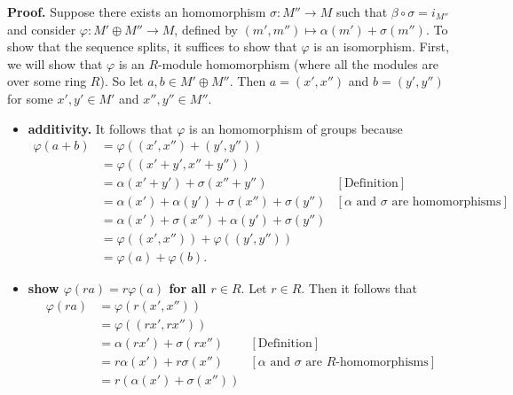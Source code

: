 \documentclass[9pt]{article}
\begin{document}
\begin{enumerate}
      \textbf{Proof.} Suppose there exists an homomorphism
      $\sigma : M''\rightarrow M$ such that $\beta \circ \sigma = i_{M''}$ and
      consider $\varphi : M' \oplus M'' \rightarrow M$, defined by
      $(m', m'') \mapsto \alpha(m') + \sigma(m'')$. To show that the sequence
      splits, it suffices to show that $\varphi$ is an isomorphism. First, we
      will show that $\varphi$ is an $R$-module homomorphism (where all the
      modules are over some ring $R$). So let $a, b \in M' \oplus M''$. Then
      $a = (x', x'')$ and $b = (y', y'')$ for some $x', y' \in M'$ and
      $x'', y'' \in M''$. 
      \begin{itemize}
         \item \textbf{additivity.} It follows that $\varphi$ is an homomorphism
               of groups because
               \begin{align*}
                  \varphi(a + b) &= \varphi((x', x'') + (y', y'')) \\
                     &= \varphi((x' + y', x'' + y'')) \\
                     &= \alpha(x' + y') + \sigma(x'' + y'')
                        &[\text{Definition}] \\
                     &= \alpha(x') + \alpha(y') + \sigma(x'') + \sigma(y'')
                        &[\alpha \text{ and } \sigma\text{ are homomorphisms}]\\
                     &= \alpha(x') + \sigma(x'') + \alpha(y') + \sigma(y'') \\
                     &= \varphi((x', x'')) + \varphi((y', y'')) \\
                     &= \varphi(a) + \varphi(b).
               \end{align*}
         \item \textbf{show $\varphi(ra) = r\varphi(a)$ for all $r \in R$}. Let
               $r \in R$. Then it follows that
               \begin{align*}
                  \varphi(ra) &= \varphi(r(x', x'')) \\
                     &= \varphi((rx', rx'')) \\
                     &= \alpha(rx') + \sigma(rx'') &[\text{Definition}] \\
                     &= r\alpha(x') + r\sigma(x'') &[\alpha \text{ and }
                        \sigma\text{ are $R$-homomorphisms}] \\
                     &= r(\alpha(x') + \sigma(x'')) \\

\end{align*}
\end{itemize}
\end{enumerate}
\end{document}
